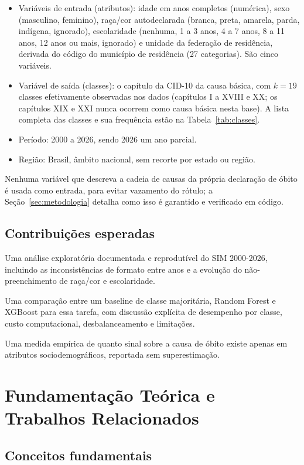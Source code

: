 \documentclass[12pt]{article}
\begin{document}
\begin{itemize}
  \item Variáveis de entrada (atributos): idade em anos completos (numérica), sexo (masculino, feminino), raça/cor autodeclarada (branca, preta, amarela, parda, indígena, ignorado), escolaridade (nenhuma, 1 a 3 anos, 4 a 7 anos, 8 a 11 anos, 12 anos ou mais, ignorado) e unidade da federação de residência, derivada do código do município de residência (27 categorias). São cinco variáveis.
  \item Variável de saída (classes): o capítulo da CID-10 da causa básica, com $k = 19$ classes efetivamente observadas nos dados (capítulos I a XVIII e XX; os capítulos XIX e XXI nunca ocorrem como causa básica nesta base). A lista completa das classes e sua frequência estão na
    Tabela~\ref{tab:classes}.
  \item Período: 2000 a 2026, sendo 2026 um ano parcial.
  \item Região: Brasil, âmbito nacional, sem recorte por estado ou região.
\end{itemize}

Nenhuma variável que descreva a cadeia de causas da própria declaração de
óbito  é usada como entrada, para evitar vazamento do rótulo;
a Seção~\ref{sec:metodologia} detalha como isso é garantido e verificado em código.

\subsection{Contribuições esperadas}

Uma análise exploratória documentada e reprodutível do SIM 2000-2026, incluindo as inconsistências de formato entre anos e a evolução do não-preenchimento de raça/cor e escolaridade.

Uma comparação entre um baseline de classe majoritária, Random Forest e XGBoost para essa tarefa, com discussão explícita de desempenho por classe, custo computacional, desbalanceamento e limitações.

Uma medida empírica de quanto sinal sobre a causa de óbito existe apenas em atributos sociodemográficos, reportada sem superestimação.

\section{Fundamentação Teórica e Trabalhos Relacionados}

\subsection{Conceitos fundamentais}
\end{document}
